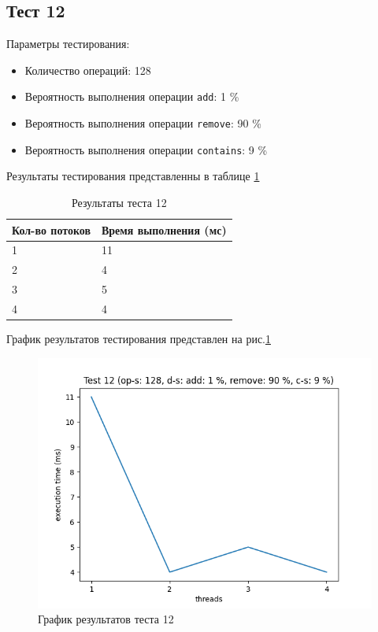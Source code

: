 \subsection*{Тест 12}

Параметры тестирования:

\begin{itemize}
    \item Количество операций: 128
    \item Вероятность выполнения операции \verb|add|: 1 \%
    \item Вероятность выполнения операции \verb|remove|: 90 \%
    \item Вероятность выполнения операции \verb|contains|: 9 \%
\end{itemize}

Результаты тестирования представленны в таблице \ref{tab:results12}


\begin{table}[H]
    \centering
    \begin{tabular}{|l|l|}
        \hline
        Кол-во потоков & Время выполнения (мс) \\
        \hline
        1 & 11 \\
        \hline
        2 & 4 \\
        \hline
        3 & 5 \\
        \hline
        4 & 4 \\
        \hline
    \end{tabular}
    \caption{Результаты теста 12}
    \label{tab:results12}
\end{table}
        

График результатов тестирования представлен на рис.\ref{fig:plot12}

\begin{figure}[H]
    \centering
    \includegraphics[width=0.7\linewidth]{photo/plot12}
    \caption{График результатов теста 12}
    \label{fig:plot12}
\end{figure}

